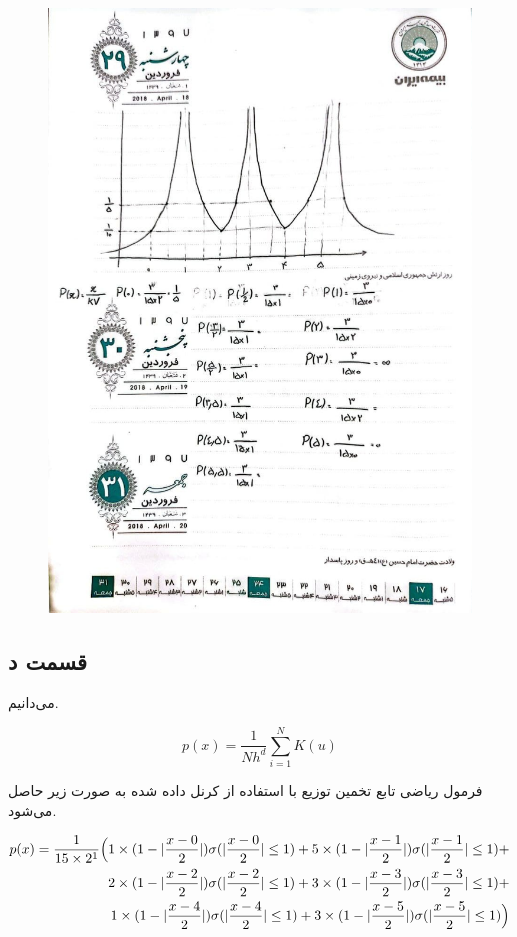 \documentclass{article}
\begin{document}
\begin{figure}[h]
    \centering
    \includegraphics[scale=0.3]{images/q1/knn.jpg}
\end{figure}

\newpage

\subsection*{قسمت د}

می‌دانیم.

$$p(x) = \frac{1}{Nh^d}\sum_{i=1}^{N}K(u)$$

فرمول ریاضی تابع تخمین توزیع با استفاده از کرنل داده شده به صورت زیر حاصل می‌شود.

\begin{eqnarray*}
    p(x) = \frac{1}{15 \times 2^1}\Bigl(1 \times (1-|\frac{x-0}{2}|)\sigma(|\frac{x-0}{2}|\leq 1) + 5 \times (1-|\frac{x-1}{2}|)\sigma(|\frac{x-1}{2}| \leq 1)+& \\
    2 \times (1-|\frac{x-2}{2}|)\sigma(|\frac{x-2}{2}| \leq 1) + 3 \times (1-|\frac{x-3}{2}|)\sigma(|\frac{x-3}{2}| \leq 1) + & \\
    1 \times (1-|\frac{x-4}{2}|)\sigma(|\frac{x-4}{2}| \leq 1) + 3 \times (1-|\frac{x-5}{2}|)\sigma(|\frac{x-5}{2}| \leq 1)\Bigr)
\end{eqnarray*}
\end{document}

